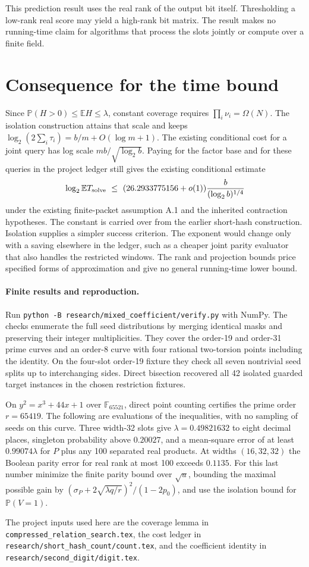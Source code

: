 \documentclass[11pt]{article}
\newcommand{\E}{\mathbb E}
\newcommand{\Prb}{\mathbb P}
\begin{document}
This prediction result uses the real rank of the output bit itself.
Thresholding a low-rank real score may yield a high-rank bit matrix.
The result makes no running-time claim for algorithms that process
the slots jointly or compute over a finite field.

\section{Consequence for the time bound}
Since $\Prb(H>0)\le\E H\le\lambda$, constant coverage requires
$\prod_i\nu_i=\Omega(N)$. The isolation construction attains that
scale and keeps $\log_2(2\sum_i\tau_i)=b/m+O(\log m+1)$.
The existing conditional cost for a joint query has log scale
$mb/\sqrt{\log_2 b}$. Paying for the factor base and for these queries
in the project ledger still gives the existing conditional estimate
\[
 \log_2 \E T_{\rm solve}\ \le\
 (26.2933775156+o(1))\frac{b}{(\log_2 b)^{1/4}}
\]
under the existing finite-packet assumption A.1 and the inherited
contraction hypotheses. The constant is carried over from the earlier
short-hash construction. Isolation supplies a simpler success criterion.
The exponent would change only with a saving elsewhere in the ledger,
such as a cheaper joint parity evaluator that also handles the
restricted windows. The rank and projection bounds price specified
forms of approximation and give no general running-time lower bound.

\paragraph{Finite results and reproduction.}
Run \texttt{python -B research/mixed\_coefficient/verify.py} with NumPy.
The checks enumerate the full seed distributions by merging identical
masks and preserving their integer multiplicities. They cover the
order-19 and order-31 prime curves and an order-8 curve with four
rational two-torsion points including the identity. On the four-slot
order-19 fixture they check all seven nontrivial seed splits up to
interchanging sides. Direct bisection recovered all 42 isolated
guarded target instances in the chosen restriction fixtures.

On $y^2=x^3+44x+1$ over $\mathbb F_{65521}$, direct point counting
certifies the prime order $r=65419$. The following are evaluations of
the inequalities, with no sampling of seeds on this curve. Three
width-32 slots give $\lambda=0.49821632$ to eight decimal places,
singleton probability above $0.20027$, and a mean-square error of at
least $0.99074\lambda$ for $P$ plus any 100 separated real products.
At widths $(16,32,32)$ the Boolean parity error for real rank at most
100 exceeds $0.1135$. For this last number minimize the finite parity
bound over $\sqrt u$, bounding the maximal possible gain by
$(\sigma_P+2\sqrt{\lambda q/r})^2/(1-2p_0)$, and use the isolation
bound for $\Prb(V=1)$.

The project inputs used here are the coverage
lemma in \texttt{compressed\_relation\_search.tex}, the cost ledger in
\texttt{research/short\_hash\_count/count.tex}, and the coefficient
identity in \texttt{research/second\_digit/digit.tex}.
\end{document}
